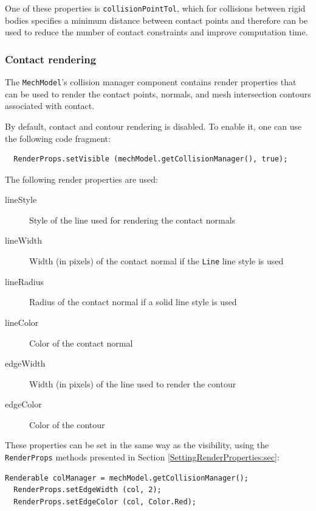 One of these properties is {\tt collisionPointTol}, which for
collisions between rigid bodies specifies a minimum distance between
contact points and therefore can be used to reduce the number of
contact constraints and improve computation time.

\subsubsection{Contact rendering}

The {\tt MechModel}'s collision manager component contains render
properties that can be used to render the contact points, normals, and
mesh intersection contours associated with contact.

By default, contact and contour rendering is disabled. To enable it,
one can use the following code fragment:
%
\begin{verbatim}
  RenderProps.setVisible (mechModel.getCollisionManager(), true);
\end{verbatim}
%
The following render properties are used:

\begin{description}

\item[lineStyle] \mbox{}
Style of the line used for rendering the contact normals

\item[lineWidth] \mbox{}
Width (in pixels) of the contact normal if the {\tt Line} line style is used

\item[lineRadius] \mbox{}
Radius of the contact normal if a solid line style is used

\item[lineColor] \mbox{}
Color of the contact normal

\item[edgeWidth] \mbox{}
Width (in pixels) of the line used to render the contour

\item[edgeColor] \mbox{}
Color of the contour

\end{description}

These properties can be set in the same way as the visibility, using
the {\tt RenderProps} methods presented in Section
\ref{SettingRenderProperties:sec}:

\begin{lstlisting}[]
  Renderable colManager = mechModel.getCollisionManager();
  RenderProps.setEdgeWidth (col, 2);
  RenderProps.setEdgeColor (col, Color.Red);
\end{lstlisting}

